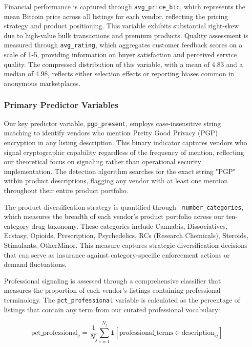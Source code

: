 \documentclass{article}
\begin{document}
Financial performance is captured through \texttt{avg_price_btc}, which represents the mean Bitcoin price across all listings for each vendor, reflecting the pricing strategy and product positioning. This variable exhibits substantial right-skew due to high-value bulk transactions and premium products. Quality assessment is measured through \texttt{avg_rating}, which aggregates customer feedback scores on a scale of 1-5, providing information on buyer satisfaction and perceived service quality. The compressed distribution of this variable, with a mean of 4.83 and a median of 4.98, reflects either selection effects or reporting biases common in anonymous marketplaces.

\subsubsection{Primary Predictor Variables}

Our key predictor variable, \texttt{pgp\_present}, employs case-insensitive string matching to identify vendors who mention Pretty Good Privacy (PGP) encryption in any listing description. This binary indicator captures vendors who signal cryptographic capability regardless of the frequency of mention, reflecting our theoretical focus on signaling rather than operational security implementation. The detection algorithm searches for the exact string "PGP" within product descriptions, flagging any vendor with at least one mention throughout their entire product portfolio.

The product diversification strategy is quantified through \texttt{ number_categories}, which measures the breadth of each vendor's product portfolio across our ten-category drug taxonomy. These categories include Cannabis, Dissociatives, Ecstasy, Opioids, Prescription, Psychedelics, RCs (Research Chemicals), Steroids, Stimulants, OtherMinor. This measure captures strategic diversification decisions that can serve as insurance against category-specific enforcement actions or demand fluctuations.

Professional signaling is assessed through a comprehensive classifier that measures the proportion of each vendor's listings containing professional terminology. The \texttt{pct\_professional} variable is calculated as the percentage of listings that contain any term from our curated professional vocabulary:

\begin{equation}
\text{pct\_professional}_j = \frac{1}{N_j} \sum_{i=1}^{N_j} \mathbf{1}[\text{professional\_terms} \in \text{description}_{ij}]
\end{equation}
\end{document}
